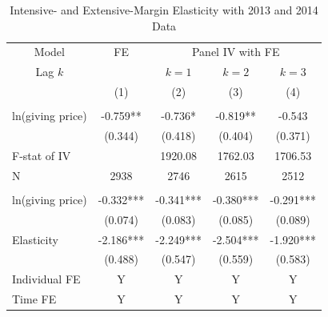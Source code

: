 \documentclass[ review  , 3p ]{elsarticle}
\begin{document}
  \begin{table}

  \caption{\label{tab:kableShortEstimateElasticityIntExt}Intensive- and Extensive-Margin Elasticity with 2013 and 2014 Data}
  \centering
  \begin{threeparttable}
  \begin{tabular}[t]{lcccc}
  \toprule
  \multicolumn{1}{c}{Model} & \multicolumn{1}{c}{FE} & \multicolumn{3}{c}{Panel IV with FE} \\
  \cmidrule(l{3pt}r{3pt}){1-1} \cmidrule(l{3pt}r{3pt}){2-2} \cmidrule(l{3pt}r{3pt}){3-5}
  \multicolumn{1}{c}{Lag $k$} & \multicolumn{1}{c}{ } & \multicolumn{1}{c}{$k = 1$} & \multicolumn{1}{c}{$k = 2$} & \multicolumn{1}{c}{$k = 3$} \\
  \cmidrule(l{3pt}r{3pt}){1-1} \cmidrule(l{3pt}r{3pt}){3-3} \cmidrule(l{3pt}r{3pt}){4-4} \cmidrule(l{3pt}r{3pt}){5-5}
   & (1) & (2) & (3) & (4)\\
  \midrule
  \addlinespace[0.3em]
  \multicolumn{5}{l}{\textbf{Intensive Margin}}\\
  \hspace{1em}ln(giving price) & -0.759** & -0.736* & -0.819** & -0.543\\
  \hspace{1em} & (0.344) & (0.418) & (0.404) & (0.371)\\
  \hspace{1em}F-stat of IV &  & 1920.08 & 1762.03 & 1706.53\\
  \hspace{1em}N & 2938 & 2746 & 2615 & 2512\\
  \addlinespace[0.3em]
  \multicolumn{5}{l}{\textbf{Extensive Margin}}\\
  \hspace{1em}ln(giving price) & -0.332*** & -0.341*** & -0.380*** & -0.291***\\
  \hspace{1em} & (0.074) & (0.083) & (0.085) & (0.089)\\
  \hspace{1em}Elasticity & -2.186*** & -2.249*** & -2.504*** & -1.920***\\
  \hspace{1em} & (0.488) & (0.547) & (0.559) & (0.583)\\
  \hspace{1em}Individual FE & Y & Y & Y & Y\\
  \hspace{1em}Time FE & Y & Y & Y & Y\\

\end{tabular}
\end{threeparttable}
\end{table}
\end{document}
